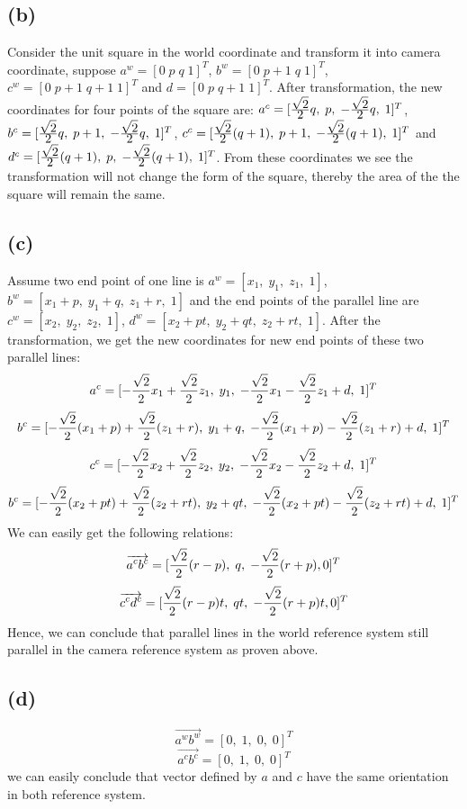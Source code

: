 \documentclass[letterpaper]{article}
\begin{document}
\subsection*{(b)}
Consider the unit square in the world coordinate and transform it into camera coordinate, suppose $a^w = [0 \; p \; q \; 1]^T$, $b^w = [0 \; 	p+1 \; q \; 1]^T$, $c^w = [0 \; p+1 \; q+1 \; 1]^T$ and $d = [0 \; p \; q+1 \; 1]^T$. After transformation, the new coordinates for four points of the square are: $a^c = [\frac{\displaystyle \sqrt{2}}{\displaystyle 2}q ,\; p, \; -\frac{\displaystyle \sqrt{2}}{\displaystyle 2}q, \; 1]^T$, $b^c = [\frac{\displaystyle \sqrt{2}}{\displaystyle 2}q ,\; p+1, \; -\frac{\displaystyle \sqrt{2}}{\displaystyle 2}q, \; 1]^T$, $c^c = [\frac{\displaystyle \sqrt{2}}{\displaystyle 2}(q+1) ,\; p+1, \; -\frac{\displaystyle \sqrt{2}}{\displaystyle 2}(q+1), \; 1]^T$ and $d^c = [\frac{\displaystyle \sqrt{2}}{\displaystyle 2}(q+1) ,\; p, \; -\frac{\displaystyle \sqrt{2}}{\displaystyle 2}(q+1), \; 1]^T$. From these coordinates we see the transformation will not change the form of the square, thereby the area of the the square will remain the same.
\subsection*{(c)}
Assume two end point of one line is $a^w = [x_1,\; y_1,\; z_1,\; 1]$, $b^w = [x_1+p,\; y_1+q,\; z_1+r,\; 1]$ and the end points of the parallel line are $c^w = [x_2,\; y_2,\; z_2,\; 1]$, $d^w = [x_2+pt,\; y_2+qt,\; z_2+rt,\; 1]$. After the transformation, we get the new coordinates for new end points of these two parallel lines:
$$a^c = [-\frac{\displaystyle \sqrt{2}}{\displaystyle 2}x_1 + \frac{\displaystyle \sqrt{2}}{\displaystyle 2}z_1,\; y_1,\; -\frac{\displaystyle \sqrt{2}}{\displaystyle 2}x_1 - \frac{\displaystyle \sqrt{2}}{\displaystyle 2}z_1 + d,\; 1]^T$$
$$b^c = [-\frac{\displaystyle \sqrt{2}}{\displaystyle 2}(x_1 + p) + \frac{\displaystyle \sqrt{2}}{\displaystyle 2}(z_1 + r),\; y_1 + q,\; -\frac{\displaystyle \sqrt{2}}{\displaystyle 2}(x_1 + p) - \frac{\displaystyle \sqrt{2}}{\displaystyle 2}(z_1 + r) + d,\; 1]^T$$
$$c^c = [-\frac{\displaystyle \sqrt{2}}{\displaystyle 2}x_2 + \frac{\displaystyle \sqrt{2}}{\displaystyle 2}z_2,\; y_2,\; -\frac{\displaystyle \sqrt{2}}{\displaystyle 2}x_2 - \frac{\displaystyle \sqrt{2}}{\displaystyle 2}z_2 + d,\; 1]^T$$
$$b^c = [-\frac{\displaystyle \sqrt{2}}{\displaystyle 2}(x_2 + pt) + \frac{\displaystyle \sqrt{2}}{\displaystyle 2}(z_2 + rt),\; y_2 + qt,\; -\frac{\displaystyle \sqrt{2}}{\displaystyle 2}(x_2 + pt) - \frac{\displaystyle \sqrt{2}}{\displaystyle 2}(z_2 + rt) + d,\; 1]^T$$
We can easily get the following relations:
$$\overrightarrow{a^cb^c} = [\frac{\displaystyle \sqrt{2}}{\displaystyle 2}(r - p),\; q,\; -\frac{\displaystyle \sqrt{2}}{\displaystyle 2}(r + p), 0]^T$$
$$\overrightarrow{c^cd^c} = [\frac{\displaystyle \sqrt{2}}{\displaystyle 2}(r - p)t,\; qt,\; -\frac{\displaystyle \sqrt{2}}{\displaystyle 2}(r + p)t, 0]^T$$
Hence, we can conclude that parallel lines in the world reference system still parallel in the camera reference system as proven above.
\subsection*{(d)}
$$\overrightarrow{a^wb^w} = [0,\; 1,\; 0,\; 0]^T$$
$$\overrightarrow{a^cb^c} = [0,\; 1,\; 0,\; 0]^T$$
we can easily conclude that vector defined by $a$ and $c$ have the same orientation in both reference system.
\end{document}

